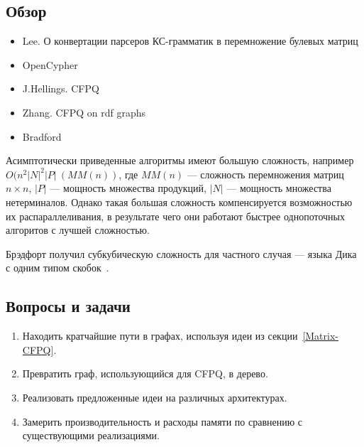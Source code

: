 \subsection{Обзор}
\begin{itemize}
	\item Lee. О конвертации парсеров КС-грамматик в перемножение булевых матриц~\cite{Lee:2002:FCG:505241.505242}
	\item OpenCypher~\cite{Kuijpers:2019:ESC:3335783.3335791}
	\item J.Hellings. CFPQ~\cite{hellingsRelational,hellings2015querying,Hellings2015PathRF}
	\item Zhang. CFPQ on rdf graphs~\cite{10.1007/978-3-319-46523-4_38}
	\item Bradford~\cite{bradford2007quickest,ward2008distributed,bradford2016fast,Bradford:2008:LCG:1373936.1373946}
\end{itemize}

Асимптотически приведенные алгоритмы имеют большую сложность, например \\ $O(n^2 |N|^2|P|~ (MM(n))$, где $MM(n)$ --- сложность перемножения матриц $n \times n$, $|P|$ --- мощность множества продукций, $|N|$ --- мощность множества нетерминалов. Однако такая большая сложность компенсируется возможностью их распараллеливания, в результате чего они работают быстрее однопоточных алгоритов с лучшей сложностью.

Брэдфорт получил субкубическую сложность для частного случая --- языка Дика с одним типом скобок~\cite{8249039}.

\subsection{Вопросы и задачи}
\begin{enumerate}
	\item Находить кратчайшие пути в графах, используя идеи из секции~\ref{Matrix-CFPQ}.
	\item Превратить граф, использующийся для CFPQ, в дерево.
  	\item Реализовать предложенные идеи на различных архитектурах.
  	\item Замерить производительность и расходы памяти по сравнению с существующими реализациями.
\end{enumerate}
